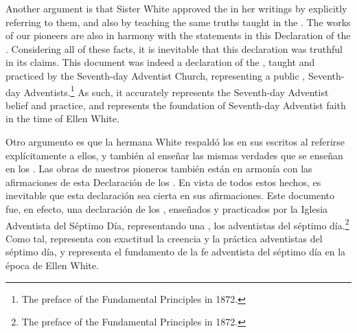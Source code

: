Another argument is that Sister White approved the  in her writings by explicitly referring to them, and also by teaching the same truths taught in the . The works of our pioneers are also in harmony with the statements in this Declaration of the . Considering all of these facts, it is inevitable that this declaration was truthful in its claims. This document was indeed a declaration of the , taught and practiced by the Seventh-day Adventist Church, representing a public ,  Seventh-day Adventists.\footnote{The preface of the Fundamental Principles in 1872.} As such, it accurately represents the Seventh-day Adventist belief and practice, and represents the foundation of Seventh-day Adventist faith in the time of Ellen White.


Otro argumento es que la hermana White respaldó los  en sus escritos al referirse explícitamente a ellos, y también al enseñar las mismas verdades que se enseñan en los . Las obras de nuestros pioneros también están en armonía con las afirmaciones de esta Declaración de los . En vista de todos estos hechos, es inevitable que esta declaración sea cierta en sus afirmaciones. Este documento fue, en efecto, una declaración de los , enseñados y practicados por la Iglesia Adventista del Séptimo Día, representando una ,  los adventistas del séptimo día.\footnote{The preface of the Fundamental Principles in 1872.} Como tal, representa con exactitud la creencia y la práctica adventistas del séptimo día, y representa el fundamento de la fe adventista del séptimo día en la época de Ellen White.


